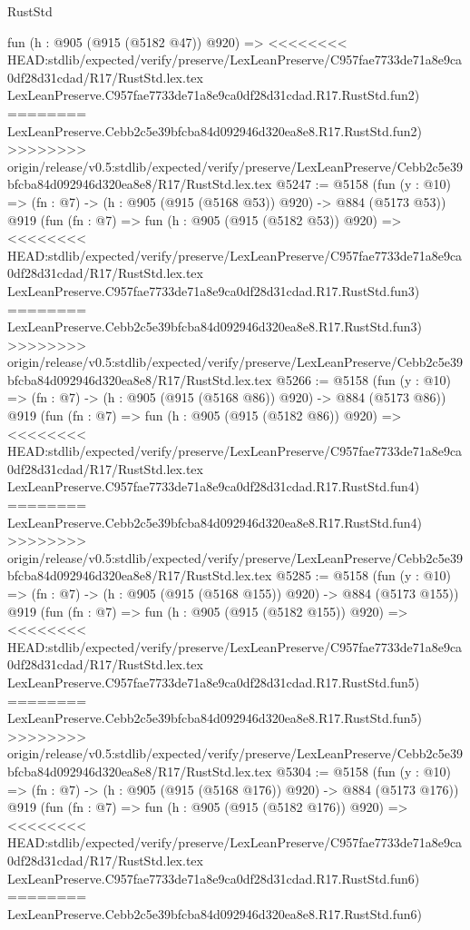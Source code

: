 \begin{lexlean}{RustStd}
\begin{coremodule}
{\begin{coremodule}
{{{{{{{{{{{{{{    fun (h : @905 (@915 (@5182 @47)) @920) =>
<<<<<<<< HEAD:stdlib/expected/verify/preserve/LexLeanPreserve/C957fae7733de71a8e9ca0df28d31cdad/R17/RustStd.lex.tex
    LexLeanPreserve.C957fae7733de71a8e9ca0df28d31cdad.R17.RustStd.fun2)
========
    LexLeanPreserve.Cebb2c5e39bfcba84d092946d320ea8e8.R17.RustStd.fun2)
>>>>>>>> origin/release/v0.5:stdlib/expected/verify/preserve/LexLeanPreserve/Cebb2c5e39bfcba84d092946d320ea8e8/R17/RustStd.lex.tex
@5247 := @5158
    (fun (y : @10) => (fn : @7) -> (h : @905 (@915 (@5168 @53)) @920) -> @884 (@5173 @53))
    @919
    (fun (fn : @7) =>
    fun (h : @905 (@915 (@5182 @53)) @920) =>
<<<<<<<< HEAD:stdlib/expected/verify/preserve/LexLeanPreserve/C957fae7733de71a8e9ca0df28d31cdad/R17/RustStd.lex.tex
    LexLeanPreserve.C957fae7733de71a8e9ca0df28d31cdad.R17.RustStd.fun3)
========
    LexLeanPreserve.Cebb2c5e39bfcba84d092946d320ea8e8.R17.RustStd.fun3)
>>>>>>>> origin/release/v0.5:stdlib/expected/verify/preserve/LexLeanPreserve/Cebb2c5e39bfcba84d092946d320ea8e8/R17/RustStd.lex.tex
@5266 := @5158
    (fun (y : @10) => (fn : @7) -> (h : @905 (@915 (@5168 @86)) @920) -> @884 (@5173 @86))
    @919
    (fun (fn : @7) =>
    fun (h : @905 (@915 (@5182 @86)) @920) =>
<<<<<<<< HEAD:stdlib/expected/verify/preserve/LexLeanPreserve/C957fae7733de71a8e9ca0df28d31cdad/R17/RustStd.lex.tex
    LexLeanPreserve.C957fae7733de71a8e9ca0df28d31cdad.R17.RustStd.fun4)
========
    LexLeanPreserve.Cebb2c5e39bfcba84d092946d320ea8e8.R17.RustStd.fun4)
>>>>>>>> origin/release/v0.5:stdlib/expected/verify/preserve/LexLeanPreserve/Cebb2c5e39bfcba84d092946d320ea8e8/R17/RustStd.lex.tex
@5285 := @5158
    (fun (y : @10) => (fn : @7) -> (h : @905 (@915 (@5168 @155)) @920) -> @884 (@5173 @155))
    @919
    (fun (fn : @7) =>
    fun (h : @905 (@915 (@5182 @155)) @920) =>
<<<<<<<< HEAD:stdlib/expected/verify/preserve/LexLeanPreserve/C957fae7733de71a8e9ca0df28d31cdad/R17/RustStd.lex.tex
    LexLeanPreserve.C957fae7733de71a8e9ca0df28d31cdad.R17.RustStd.fun5)
========
    LexLeanPreserve.Cebb2c5e39bfcba84d092946d320ea8e8.R17.RustStd.fun5)
>>>>>>>> origin/release/v0.5:stdlib/expected/verify/preserve/LexLeanPreserve/Cebb2c5e39bfcba84d092946d320ea8e8/R17/RustStd.lex.tex
@5304 := @5158
    (fun (y : @10) => (fn : @7) -> (h : @905 (@915 (@5168 @176)) @920) -> @884 (@5173 @176))
    @919
    (fun (fn : @7) =>
    fun (h : @905 (@915 (@5182 @176)) @920) =>
<<<<<<<< HEAD:stdlib/expected/verify/preserve/LexLeanPreserve/C957fae7733de71a8e9ca0df28d31cdad/R17/RustStd.lex.tex
    LexLeanPreserve.C957fae7733de71a8e9ca0df28d31cdad.R17.RustStd.fun6)
========
    LexLeanPreserve.Cebb2c5e39bfcba84d092946d320ea8e8.R17.RustStd.fun6)
}}}}}}}}}}}}}}
\end{coremodule}}
\end{coremodule}
\end{lexlean}
